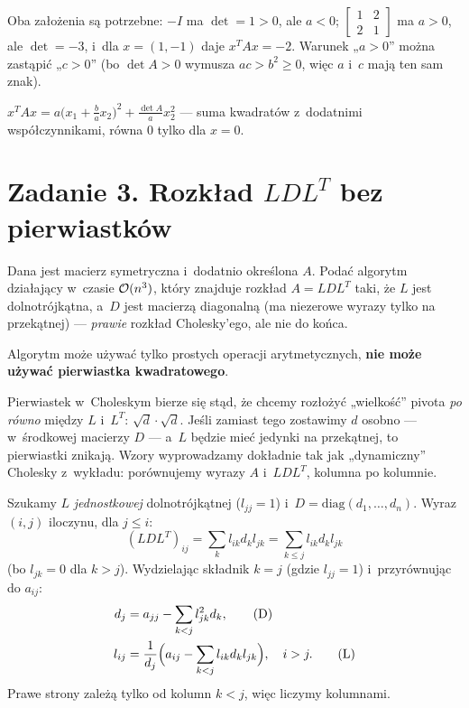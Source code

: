 \documentclass[11pt]{article}
\begin{document}
\begin{uwaga}
Oba założenia są potrzebne: $-I$ ma $\det=1>0$, ale $a<0$;
$\left[\begin{smallmatrix}1&2\\2&1\end{smallmatrix}\right]$ ma $a>0$,
ale $\det=-3$, i~dla $x=(1,-1)$ daje $x^TAx=-2$. Warunek „$a>0$”
można zastąpić „$c>0$” (bo $\det A>0$ wymusza $ac>b^2\ge0$, więc
$a$ i~$c$ mają ten sam znak).
\end{uwaga}

\begin{odpowiedz}
$x^TAx=a\bigl(x_1+\frac bax_2\bigr)^2+\frac{\det A}{a}x_2^2$ --- suma
kwadratów z~dodatnimi współczynnikami, równa $0$ tylko dla $x=0$.
\end{odpowiedz}

\section{Zadanie 3. Rozkład \texorpdfstring{$LDL^T$}{LDLᵀ} bez pierwiastków}
\begin{tresc}
Dana jest macierz symetryczna i~dodatnio określona $A$. Podać algorytm
działający w~czasie $\mathcal{O}(n^3)$, który znajduje rozkład $A=LDL^T$ taki,
że $L$ jest dolnotrójkątna, a~$D$ jest macierzą diagonalną (ma niezerowe
wyrazy tylko na przekątnej) --- \emph{prawie} rozkład Cholesky'ego, ale
nie do końca.

Algorytm może używać tylko prostych operacji arytmetycznych,
\textbf{nie może używać pierwiastka kwadratowego}.
\end{tresc}

\begin{intuicja}
Pierwiastek w~Choleskym bierze się stąd, że chcemy rozłożyć
„wielkość” pivota \emph{po równo} między $L$ i~$L^T$:
$\sqrt{d}\cdot\sqrt{d}$. Jeśli zamiast tego zostawimy $d$ osobno ---
w~środkowej macierzy $D$ --- a~$L$ będzie mieć jedynki na przekątnej, to
pierwiastki znikają. Wzory wyprowadzamy dokładnie tak jak „dynamiczny”
Cholesky z~wykładu: porównujemy wyrazy $A$ i~$LDL^T$, kolumna po kolumnie.
\end{intuicja}

\formalnie
Szukamy $L$ \emph{jednostkowej} dolnotrójkątnej ($l_{jj}=1$) i~$D=
\mathrm{diag}(d_1,\ldots,d_n)$. Wyraz $(i,j)$ iloczynu, dla $j\le i$:
\[
(LDL^T)_{ij}=\sum_{k}l_{ik}d_kl_{jk}=\sum_{k\le j}l_{ik}d_kl_{jk}
\]
(bo $l_{jk}=0$ dla $k>j$). Wydzielając składnik $k=j$ (gdzie $l_{jj}=1$)
i~przyrównując do $a_{ij}$:
\begin{align}
d_j&=a_{jj}-\sum_{k<j}l_{jk}^2d_k,\tag{D}\\
l_{ij}&=\frac1{d_j}\Bigl(a_{ij}-\sum_{k<j}l_{ik}d_kl_{jk}\Bigr),
\quad i>j.\tag{L}
\end{align}
Prawe strony zależą tylko od kolumn $k<j$, więc liczymy kolumnami.
\end{document}
